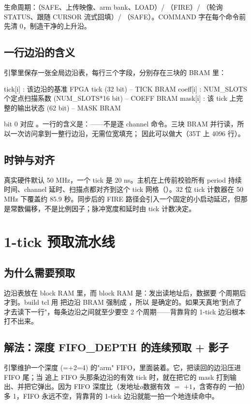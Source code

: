 \documentclass[11pt,oneside,openany]{book}
\begin{document}
生命周期：（SAFE、上传映像、arm bank、LOAD）/ （FIRE）/ （轮询 STATUS、跟随 CURSOR 流式回填）/ （SAFE）。COMMAND 字在每个命令前先清 0，制造干净的上升沿。

\section{一行边沿的含义}
引擎里保存一张全局边沿表，每行三个字段，分别存在三块的 BRAM 里：

\begin{codeblock}[每行边沿]
tick[i]  : 该边沿的基准 FPGA tick (32 bit)            -- TICK BRAM
coeff[i] : NUM_SLOTS 个定点扫描系数 (NUM_SLOTS*16 bit) -- COEFF BRAM
mask[i]  : 该 tick 上完整的输出状态 (62 bit)          -- MASK BRAM
\end{codeblock}

bit 0 对应 。一行的含义是：——不是逐 channel 命令。三块 BRAM 并行读，所以一次访问拿到一整行边沿，无需位宽填充； 因此可以做大（35T 上 4096 行）。

\section{时钟与对齐}
真实硬件默认 50 MHz，一个 tick 是 20 ns。主机在上传前校验所有 period 持续时间、channel 延时、扫描点都对齐到这个 tick 网格（）。32 位 tick 计数器在 50 MHz 下覆盖约 85.9 秒。同步后的 FIRE 路径会引入一个固定的小启动延迟，但那是常数偏移，不是比例因子；脉冲宽度和延时由 tick 计数决定。

\chapter{1-tick 预取流水线}

\section{为什么需要预取}
边沿表放在 block RAM 里，而 block RAM 是：发出读地址后，数据要  个周期后才到。build tcl 用  把边沿 BRAM 强制成 ，所以  是确定的。如果天真地"到点了才去读下一行"，每条边沿之间就至少要空 2 个周期——背靠背的 1-tick 边沿根本打不出来。

\section{解法：深度 FIFO\_DEPTH 的连续预取 + 影子}
引擎维护一个深度 (=+2=4) 的"arm" FIFO，里面装着。它，把读回的边沿压进 FIFO 尾；当  追上 FIFO 头那条边沿的有效 tick 时，就在把它的 mask 打到输出、并把它弹出。因为 FIFO 深度比（发地址$	o$数据有效 $=$ $+1$，含寄存的  一拍）多 1，FIFO 永远不空，背靠背的 1-tick 边沿就能一拍一个地连续命中。
\end{document}
